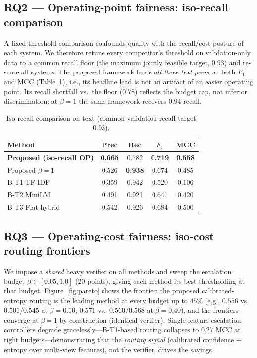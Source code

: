 \documentclass[conference]{IEEEtran}
\newcommand{\fone}{F_{1}}
\begin{document}
\subsection{RQ2 --- Operating-point fairness: iso-recall comparison}
\label{sec:isorecall}
A fixed-threshold comparison confounds quality with the recall/cost posture of each system. We
therefore retune every competitor's threshold on validation-only data to a common recall floor
(the maximum jointly feasible target, $0.93$) and re-score all systems. The proposed framework
leads \emph{all three text peers} on both $\fone$ and MCC (Table~\ref{tab:isorecall}), i.e., its
headline lead is not an artifact of an easier operating point. Its recall shortfall vs.\ the floor
($0.78$) reflects the budget cap, not inferior discrimination: at $\beta{=}1$ the same framework recovers
$0.94$ recall.

\begin{table}[t]
\centering
\caption{Iso-recall comparison on text (common validation recall target 0.93).}
\label{tab:isorecall}
\small
\begin{tabular}{@{}l cccc@{}}
\toprule
Method & Prec & Rec & $\fone$ & MCC \\
\midrule
\textbf{Proposed (iso-recall OP)} & \textbf{0.665} & 0.782 & \textbf{0.719} & \textbf{0.558} \\
Proposed $\beta{=}1$ & 0.526 & \textbf{0.938} & 0.674 & 0.485 \\
B-T1 TF-IDF & 0.359 & 0.942 & 0.520 & 0.106 \\
B-T2 MiniLM & 0.491 & 0.921 & 0.641 & 0.420 \\
B-T3 Flat hybrid & 0.542 & 0.926 & 0.684 & 0.500 \\
\bottomrule
\end{tabular}
\end{table}

\subsection{RQ3 --- Operating-cost fairness: iso-cost routing frontiers}
\label{sec:isocost}
We impose a \emph{shared} heavy verifier on all methods and sweep the escalation budget
$\beta \in [0.05, 1.0]$ (20 points), giving each method its best thresholding at that budget.
Figure~\ref{fig:pareto} shows the frontier: the proposed calibrated-entropy routing
is the leading method at every budget up to $45\%$ (e.g., $0.556$ vs.\ $0.501$/$0.545$ at
$\beta{=}0.10$; $0.571$ vs.\ $0.560$/$0.568$ at $\beta{=}0.40$), and the frontiers converge at
$\beta{=}1$ by construction (identical verifier). Single-feature escalation controllers degrade
gracelessly---B-T1-based routing collapses to $0.27$ MCC at tight budgets---demonstrating that the
\emph{routing signal} (calibrated confidence + entropy over multi-view features), not the verifier,
drives the savings.
\end{document}
